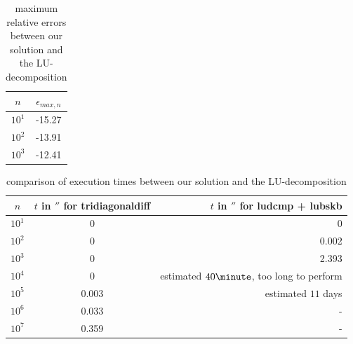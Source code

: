 \documentclass[11pt,a4wide]{article}
\begin{document}
 \begin{table}%
\centering
\caption{maximum relative errors between our solution and the LU-decomposition} 
\begin{tabular}{cc}\hline
$n$ & $\epsilon_{max,n}$\\\hline
$10^1$ & -15.27 \\ 
$10^2$ & -13.91\\ 
$10^3$ & -12.41 \\ \hline
 \end{tabular}
 \label{LUvsown}
 \end{table}
 \begin{table}%
\centering
\caption{comparison of execution times between our solution and the LU-decomposition}
  \begin{tabular}{ccr}\hline
$n$ & $t$ in $\second$ for tridiagonaldiff & $t$ in $\second$ for ludcmp + lubskb \\\hline
$10^1$ & 0 & 0 \\ 
$10^2$ & 0 & 0.002 \\
$10^3$ & 0 & 2.393 \\
$10^4$ & 0 & estimated $40\minute$, too long to perform\\
$10^5$ & 0.003 & estimated $11$ days\\
$10^6$ & 0.033 & - \\
$10^7$ & 0.359 & -  \\ \hline
\end{tabular}
 \label{LUvsowncomp}
 \end{table}
\end{document}
